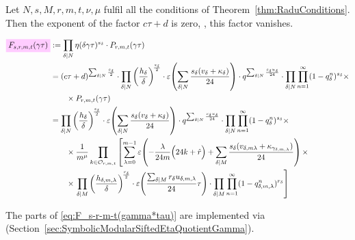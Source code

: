 \documentclass{article}
\begin{document}
Let $N, s, M, r, m, t, \nu, \mu$ fulfil all the conditions of
Theorem~\ref{thm:RaduConditions}. Then the exponent of the factor
$c\tau+d$ is zero, \ie, this factor vanishes.

\begin{align}
  \defineNotation[F-s-r-m-t-gamma-tau]{F_{s,r,m,t}(\gamma\tau)}
  &:= \divisorprod{N} \eta(\delta\gamma\tau)^{s_\delta}
    \cdot
    P_{r, m, t}(\gamma\tau)
  \notag\\
  &=
  (c\tau+d)^{\divisorsum{N} \frac{s_\delta}{2}}
  \cdot
  \divisorprod{N}
  \left(\frac{h_\delta}{\delta}\right)^{\!\frac{s_\delta}{2}}
  \cdot
  \unityPower{\divisorsum{N} \frac{s_\delta(v_\delta + \kappa_\delta)}{24}}
  \cdot
  q^{\divisorsum{N} \frac{s_\delta u_\delta}{24}}
  \cdot
    \divisorprod{N} \prod_{n=1}^{\infty}(1-q_\delta^n)^{s_\delta} \times\notag\\
  &\qquad\times
    P_{r, m, t}(\gamma\tau)
  \notag\\
  &=
  \divisorprod{N}
  \left(\frac{h_\delta}{\delta}\right)^{\!\frac{s_\delta}{2}}
  \cdot
  \unityPower{\divisorsum{N} \frac{s_\delta(v_\delta + \kappa_\delta)}{24}}
  \cdot
  q^{\divisorsum{N} \frac{s_\delta u_\delta}{24}}
    \cdot
    \divisorprod{N} \prod_{n=1}^{\infty}(1-q_\delta^n)^{s_\delta} \times\notag\\
  &\qquad\times
    \frac{1}{m^\mu}
    \prod_{k\in \modularOrbit{r,m,t}}
    \left[\sum_{\lambda=0}^{m-1}
    \unityPower{-\frac{\lambda}{24m}\Bigl(24k+\sumdelta{r}\Bigr)
    + \divisorsum{M}\frac{s_\delta(v_{\delta,m\lambda} +
    \kappa_{\gamma_{\delta,m,\lambda}})}{24}} \times\right.\notag\\
  &\qquad\times
    \left.
    \divisorprod{M}
    \left(\frac{h_{\delta,m,\lambda}}{\delta}\right)^{\!\frac{r_\delta}{2}}
    \cdot
    \unityPower{\frac{\divisorsum{M} r_\delta u_{\delta,m,\lambda}}{24}\tau}
    \cdot
    \divisorprod{M} \prod_{n=1}^\infty (1-q_{\delta,m,\lambda}^n)^{r_\delta}
    \right]
    \label{eq:F_s-r-m-t(gamma*tau)}
\end{align}


The parts of \eqref{eq:F_s-r-m-t(gamma*tau)} are implemented via
\textcolor{blue}{}
(Section~\ref{sec:SymbolicModularSiftedEtaQuotientGamma}).
\end{document}
